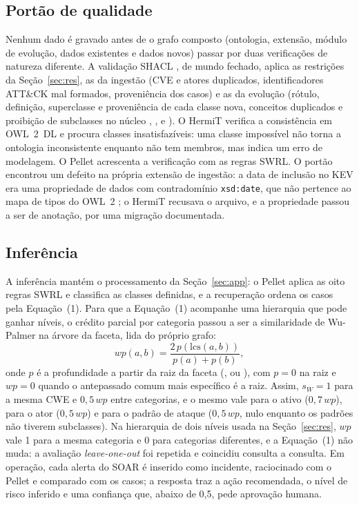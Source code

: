 \subsection{Portão de qualidade}
\label{sec:portao}

Nenhum dado é gravado antes de o grafo composto (ontologia, extensão, módulo de evolução, dados existentes e dados novos) passar por duas verificações de natureza diferente. A validação SHACL \cite{shacl}, de mundo fechado, aplica as restrições da Seção~\ref{sec:res}, as da ingestão (CVE e atores duplicados, identificadores ATT\&CK mal formados, proveniência dos casos) e as da evolução (rótulo, definição, superclasse e proveniência de cada classe nova, conceitos duplicados e proibição de subclasses no núcleo , ,  e ). O HermiT \cite{hermit} verifica a consistência em OWL~2~DL e procura classes insatisfazíveis: uma classe impossível não torna a ontologia inconsistente enquanto não tem membros, mas indica um erro de modelagem. O Pellet acrescenta a verificação com as regras SWRL. O portão encontrou um defeito na própria extensão de ingestão: a data de inclusão no KEV era uma propriedade de dados com contradomínio \texttt{xsd:date}, que não pertence ao mapa de tipos do OWL~2 \cite{owl2}; o HermiT recusava o arquivo, e a propriedade passou a ser de anotação, por uma migração documentada.

\subsection{Inferência}

A inferência mantém o processamento da Seção~\ref{sec:app}: o Pellet aplica as oito regras SWRL e classifica as classes definidas, e a recuperação ordena os casos pela Equação~(1). Para que a Equação~(1) acompanhe uma hierarquia que pode ganhar níveis, o crédito parcial por categoria passou a ser a similaridade de Wu-Palmer \cite{wupalmer1994} na árvore da faceta, lida do próprio grafo:
\begin{equation}
wp(a,b) = \frac{2\,p(\mathrm{lcs}(a,b))}{p(a)+p(b)},
\end{equation}
onde $p$ é a profundidade a partir da raiz da faceta (,  ou ), com $p=0$ na raiz e $wp=0$ quando o antepassado comum mais específico é a raiz. Assim, $s_W = 1$ para a mesma CWE e $0{,}5\,wp$ entre categorias, e o mesmo vale para o ativo ($0{,}7\,wp$), para o ator ($0{,}5\,wp$) e para o padrão de ataque ($0{,}5\,wp$, nulo enquanto os padrões não tiverem subclasses). Na hierarquia de dois níveis usada na Seção~\ref{sec:res}, $wp$ vale 1 para a mesma categoria e 0 para categorias diferentes, e a Equação~(1) não muda: a avaliação \emph{leave-one-out} foi repetida e coincidiu consulta a consulta. Em operação, cada alerta do SOAR é inserido como incidente, raciocinado com o Pellet e comparado com os casos; a resposta traz a ação recomendada, o nível de risco inferido e uma confiança que, abaixo de 0,5, pede aprovação humana.

